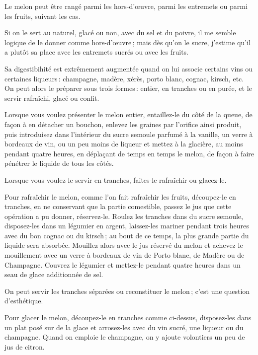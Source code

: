 Le melon peut être rangé parmi les hors-d'œuvre, parmi les entremets ou
parmi les fruits, suivant les cas.

Si on le sert au naturel, glacé ou non, avec du sel et du poivre, il me semble
logique de le donner comme hors-d'œuvre ; mais dès qu'on le sucre, j'estime
qu'il a plutôt sa place avec les entremets sucrés ou avec les fruits.

Sa digestibihité est extrêmement augmentée quand on lui associe certains vins
ou certaines liqueurs : champagne, madère, xérès, porto blanc, cognac, kirsch,
etc. On peut alors le préparer sous trois formes : entier, en tranches ou en
purée, et le servir rafraîchi, glacé ou confit.

\sk

Lorsque vous voulez présenter le melon entier, entaillez-le du côté de la queue,
de façon à en détacher un bouchon, enlevez les graines par l’orifice ainsi produit,
puis introduisez dans l'intérieur du sucre semoule parfumé à la vanille, un verre
à bordeaux de vin, ou un peu moins de liqueur et mettez à la glacière, au moins
pendant quatre heures, en déplaçant de temps en temps le melon, de façon à faire
pénétrer le liquide de tous les côtés.

\sk

Lorsque vous voulez le servir en tranches, faites-le rafraîchir ou glacez-le.

Pour rafraîchir le melon, comme l'on fait rafraîchir les fruits, découpez-le en
tranches, en ne conservant que la partie comestible, passez le jus que cette
opération a pu donner, réservez-le. Roulez les tranches dans du sucre semoule,
disposez-les dans un légumier en argent, laissez-les mariner pendant trois
heures avec du bon cognac ou du kirsch ; au bout de ce temps, la plus grande
partie du liquide sera absorbée. Mouillez alors avec le jus réservé du melon
et achevez le mouillement avec un verre à bordeaux de vin de Porto blanc, de
Madère ou de Champagne. Couvrez le légumier et mettez-le pendant quatre heures
dans un seau de glace additionnée de sel.

\medskip

On peut servir les tranches séparées ou reconstituer le melon ; c'est une
question d'esthétique.

\sk

Pour glacer le melon, découpez-le en tranches comme ci-dessus, disposez-les
dans un plat posé sur de la glace et arrosez-les avec du vin sucré, une liqueur
ou du champagne. Quand on emploie le champagne, on y ajoute volontiers un peu
de jus de citron.

